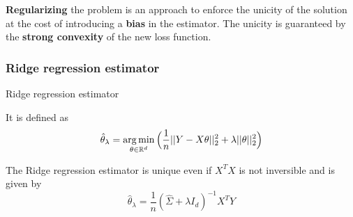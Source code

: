 \documentclass[
10pt, %
a4paper, %
oneside, %
headinclude,footinclude, %
BCOR5mm, %
]{scrartcl}
\begin{document}
\textbf{{Regularizing}} the problem is an approach to enforce the unicity of the solution at the cost of introducing a \textbf{{bias}} in the estimator. The unicity is guaranteed by the \textbf{{strong convexity}} of the new loss function.

\subsubsection{\large\color{Periwinkle}Ridge regression estimator}

\begin{definition}{Ridge regression estimator}

    It is defined as
\begin{equation}
    \label{risk:ridge}
    \hat{ \theta}_{\lambda} = \operatorname*{arg\,min}_{\theta \in \mathbb{R}^d} \Big( \frac{1}{n} ||Y-X\theta||_2^2 + \lambda || \theta||_2^2 \Big)
\end{equation}
\end{definition}


\begin{proposition}

    The Ridge regression estimator is unique even if $X^TX$ is not inversible and is given by
    \begin{equation*}
	\hat{ \theta}_{\lambda} = \frac{1}{n} ( \hat{\Sigma} +\lambda I_d)^{-1}X^TY
    \end{equation*}
\end{proposition}
\end{document}
